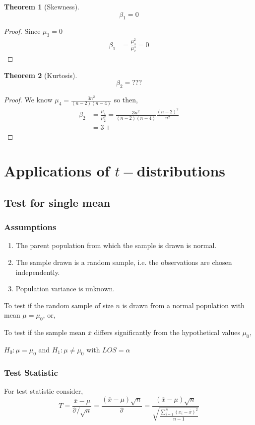 \documentclass[oneside,11pt,pdftex]{book}%
\numberwithin{equation}{section}
\newtheorem{theorem}{Theorem}[chapter]%
\numberwithin{section}{chapter}
\numberwithin{equation}{chapter}
\begin{document}
\begin{theorem}[Skewness]
	$$ \beta_1=0 $$
\end{theorem}
\begin{proof}
	Since $ \mu_3=0 $
	\begin{align*}
		\beta_1&=\frac{\mu_3^2}{\mu_2^3}=0
	\end{align*}
\end{proof}

\begin{theorem}[Kurtosis]
	\[ \beta_2=??? \]
\end{theorem}
\begin{proof}
	We know $ \mu_4=\frac{3n^2}{(n-2)(n-4)} $ so then,
	\begin{align*}
		\beta_2&=\frac{\mu_4}{\mu_2^2}=\frac{3n^2}{(n-2)(n-4)} \frac{(n-2)^2}{n^2}\\
		&=3+
	\end{align*}
\end{proof}

\section{Applications of $ t- $distributions}
\subsection{Test for single mean}
\subsubsection{Assumptions}
\begin{enumerate}
	\item The parent population from which the sample is drawn is normal.
	\item The sample drawn is a random sample, i.e. the observations are chosen independently.
	\item Population variance is unknown.
\end{enumerate}
To test if the random sample of size $ n $ is drawn from a normal population with mean $ \mu=\mu_0 $, or,

To test if the sample mean $ \overline{x} $ differs significantly from the hypothetical values $ \mu_0, $

$ H_0:\mu=\mu_0 $ and $ H_1:\mu \neq \mu_0 $ with $ LOS=\alpha $
\subsubsection{Test Statistic}
For test statistic consider,
\[ T=\frac{\overline{x}-\mu}{\hat{\sigma}/\sqrt{n}} =\frac{(\overline{x}-\mu)\sqrt{n}}{\hat{\sigma}}=\frac{(\overline{x}-\mu)\sqrt{n}}{\sqrt{\frac{\sum_{i=1}^n (x_i-\overline{x})^2}{n-1}}}\]
\end{document}
